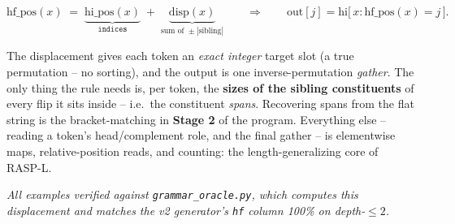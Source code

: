 \documentclass[11pt]{article}
\begin{document}
\begin{rulebox}
\vspace{-2pt}
\[
 \text{hf\_pos}(x) \;=\; \underbrace{\text{hi\_pos}(x)}_{\texttt{indices}}
 \;+\; \underbrace{\text{disp}(x)}_{\text{sum of }\pm|\text{sibling}|}
 \qquad\Longrightarrow\qquad
 \text{out}[j]=\text{hi}\big[\,x:\text{hf\_pos}(x)=j\,\big].
\]
\vspace{-9pt}
\end{rulebox}

\noindent The displacement gives each token an \emph{exact integer} target slot (a true
permutation -- no sorting), and the output is one inverse-permutation \emph{gather}. The only
thing the rule needs is, per token, the \textbf{sizes of the sibling constituents} of every
flip it sits inside -- i.e.\ the constituent \emph{spans}. Recovering spans from the flat string
is the bracket-matching in \textbf{Stage 2} of the program. Everything else -- reading a token's
head/complement role, and the final gather -- is elementwise maps, relative-position reads, and
counting: the length-generalizing core of RASP-L.

\vfill
\begin{center}\footnotesize\itshape
All examples verified against \texttt{grammar\_oracle.py}, which computes this displacement and
matches the v2 generator's \texttt{hf} column 100\% on depth-$\le 2$.
\end{center}
\end{document}

